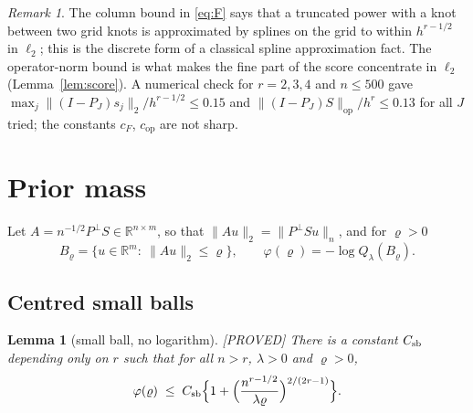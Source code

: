 \documentclass[11pt]{article}
\newtheorem{lemma}{Lemma}
\theoremstyle{definition}
\theoremstyle{remark}
\newtheorem{remark}{Remark}
\newcommand{\R}{\mathbb{R}}
\newcommand{\Ql}{Q_\lambda}
\newcommand{\Pp}{P^{\perp}}
\newcommand{\nn}[1]{\|#1\|_n}
\newcommand{\proved}{\textup{[PROVED]}}
\newcommand{\op}{\mathrm{op}}
\begin{document}
\begin{remark}
The column bound in \eqref{eq:F} says that a truncated power with a knot between two grid knots is approximated by splines on the grid to within $h^{r-1/2}$ in $\ell_2$; this is the discrete form of a classical spline approximation fact. The operator-norm bound is what makes the fine part of the score concentrate in $\ell_2$ (Lemma~\ref{lem:score}). A numerical check for $r=2,3,4$ and $n\le500$ gave $\max_j\|(I-P_J)s_j\|_2/h^{r-1/2}\le0.15$ and $\|(I-P_J)S\|_{\op}/h^{r}\le0.13$ for all $J$ tried; the constants $c_F$, $c_{\op}$ are not sharp.
\end{remark}

\section{Prior mass}\label{sec:prior}

Let $A=n^{-1/2}\Pp S\in\R^{n\times m}$, so that $\|Au\|_2=\nn{\Pp Su}$, and for $\varrho>0$
\[
B_\varrho=\{u\in\R^m:\ \|Au\|_2\le\varrho\},\qquad \varphi(\varrho)=-\log\Ql(B_\varrho).
\]

\subsection{Centred small balls}

\begin{lemma}[small ball, no logarithm]\label{lem:sb}\proved{}
There is a constant $C_{\rm sb}$ depending only on $r$ such that for all $n>r$, $\lambda>0$ and $\varrho>0$,
\[
\varphi(\varrho)\;\le\;C_{\rm sb}\Bigl\{1+\Bigl(\frac{n^{r-1/2}}{\lambda\varrho}\Bigr)^{2/(2r-1)}\Bigr\}.
\]
\end{lemma}
\end{document}
